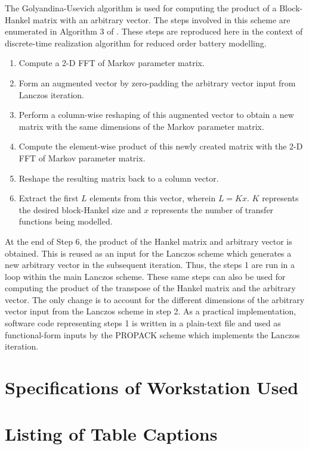 The Golyandina-Usevich algorithm is used for computing the product
of a Block-Hankel matrix with an arbitrary vector. The steps involved
in this scheme are enumerated in Algorithm 3 of \citep{GolyandinaKorobeynikovShlemovEtAl2015}.
These steps are reproduced here in the context of discrete-time realization
algorithm for reduced order battery modelling.
\begin{enumerate}
	\item Compute a 2-D FFT of Markov parameter matrix.
	\item Form an augmented vector by zero-padding the arbitrary vector input
	from Lanczos iteration.
	\item Perform a column-wise reshaping of this augmented vector to obtain
	a new matrix with the same dimensions of the Markov parameter matrix.
	\item Compute the element-wise product of this newly created matrix with
	the 2-D FFT of Markov parameter matrix.
	\item Reshape the resulting matrix back to a column vector.
	\item Extract the first $L$ elements from this vector, wherein $L=Kx$.
	$K$ represents the desired block-Hankel size and $x$ represents
	the number of transfer functions being modelled.
\end{enumerate}
At the end of Step 6, the product of the Hankel matrix and arbitrary
vector is obtained. This is reused as an input for the Lanczos scheme
which generates a new arbitrary vector in the subsequent iteration.
Thus, the steps 1 are run in a loop within the main Lanczos
scheme. These same steps can also be used for computing the product
of the transpose of the Hankel matrix and the arbitrary vector. The
only change is to account for the different dimensions of the arbitrary
vector input from the Lanczos scheme in step 2. As a practical implementation,
software code representing steps 1 is written in a plain-text
file and used as functional-form inputs by the PROPACK scheme which
implements the Lanczos iteration.

\singlespacing
\section{Specifications of Workstation Used\label{sec:Specifications-of-Workstation}}

\newpage
\section*{Listing of Table Captions}

